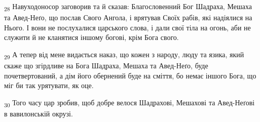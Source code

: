 \begin{tcolorbox}
\textsubscript{28} Навуходоносор заговорив та й сказав: Благословенний Бог Шадраха, Мешаха та Авед-Неґо, що послав Свого Ангола, і врятував Своїх рабів, які надіялися на Нього. І вони не послухалися царського слова, і дали свої тіла на огонь, аби не служити й не кланятися іншому богові, крім Бога свого.
\end{tcolorbox}
\begin{tcolorbox}
\textsubscript{29} А тепер від мене видається наказ, що кожен з народу, люду та язика, який скаже що згірдливе на Бога Шадраха, Мешаха та Авед-Неґо, буде почетвертований, а дім його обернений буде на сміття, бо немає іншого Бога, що міг би так урятувати, як оце.
\end{tcolorbox}
\begin{tcolorbox}
\textsubscript{30} Того часу цар зробив, щоб добре велося Шадрахові, Мешахові та Авед-Неґові в вавилонській окрузі.
\end{tcolorbox}
